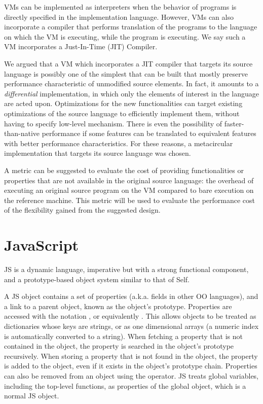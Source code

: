 VMs can be implemented as interpreters when the behavior of
programs is directly specified in the implementation language.  However, VMs
can also incorporate a compiler that performs translation of the programs to
the language on which the VM is executing, while the program is executing. We
say such a VM incorporates a Just-In-Time (JIT) Compiler. 

We argued that a VM which incorporates a JIT compiler that
targets its source language is possibly one of the simplest that can be built
that mostly preserve performance characteristic of unmodified source elements.
In fact, it amounts to a \textit{differential} implementation, in which only
the elements of interest in the language are acted upon. Optimizations for the
new functionalities can target existing optimizations of the source language to
efficiently implement them, without having to specify low-level mechanism.
There is even the possibility of faster-than-native performance if some
features can be translated to equivalent features with better performance
characteristics. For these reasons, a metacircular implementation that targets
its source language was chosen.

A metric can be suggested to evaluate the cost of providing functionalities or
properties that are not available in the original source language: the overhead
of executing an original source program on the VM compared to bare execution on
the reference machine. This metric will be used to evaluate the performance
cost of the flexibility gained from the suggested design.

\section{JavaScript}

JS is a dynamic language, imperative but with a strong functional component,
and a prototype-based object system similar to that of Self.

A JS object contains a set of properties (a.k.a. fields in other OO languages),
and a link to a parent object, known as the object's prototype. Properties are
accessed with the notation , or equivalently .
This allows objects to be treated as dictionaries whose keys are strings, or as
one dimensional arrays (a numeric index is automatically converted to a
string).  When fetching a property that is not contained in the object, the
property is searched in the object's prototype recursively. When storing a
property that is not found in the object, the property is added to the object,
even if it exists in the object's prototype chain. Properties can also be
removed from an object using the  operator. JS treats global
variables, including the top-level functions, as properties of the global
object, which is a normal JS object.

